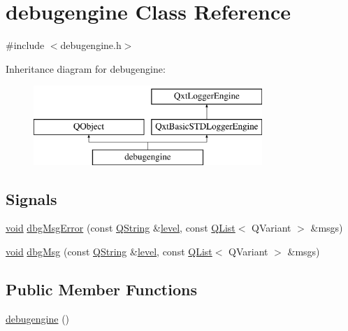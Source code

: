 \hypertarget{classdebugengine}{\section{debugengine Class Reference}
\label{classdebugengine}
}


{\ttfamily \#include $<$debugengine.\-h$>$}

Inheritance diagram for debugengine\-:\begin{figure}[H]
\begin{center}
\leavevmode
\includegraphics[height=3.000000cm]{classdebugengine}
\end{center}
\end{figure}
\subsection*{Signals}
\begin{DoxyCompactItemize}
\item 
\hyperlink{group___u_a_v_objects_plugin_ga444cf2ff3f0ecbe028adce838d373f5c}{void} \hyperlink{classdebugengine_a9f8252a6598f543f2f82476803dadeab}{dbg\-Msg\-Error} (const \hyperlink{group___u_a_v_objects_plugin_gab9d252f49c333c94a72f97ce3105a32d}{Q\-String} \&\hyperlink{glext_8h_abc60a79088789bd61297bf5f9ff500d1}{level}, const \hyperlink{class_q_list}{Q\-List}$<$ Q\-Variant $>$ \&msgs)
\item 
\hyperlink{group___u_a_v_objects_plugin_ga444cf2ff3f0ecbe028adce838d373f5c}{void} \hyperlink{classdebugengine_a0c11284286814474411d4bd14b0f13bb}{dbg\-Msg} (const \hyperlink{group___u_a_v_objects_plugin_gab9d252f49c333c94a72f97ce3105a32d}{Q\-String} \&\hyperlink{glext_8h_abc60a79088789bd61297bf5f9ff500d1}{level}, const \hyperlink{class_q_list}{Q\-List}$<$ Q\-Variant $>$ \&msgs)
\end{DoxyCompactItemize}
\subsection*{Public Member Functions}
\begin{DoxyCompactItemize}
\item 
\hyperlink{classdebugengine_acbcb56cfc3877baebe569254b3441daa}{debugengine} ()
\end{DoxyCompactItemize}
